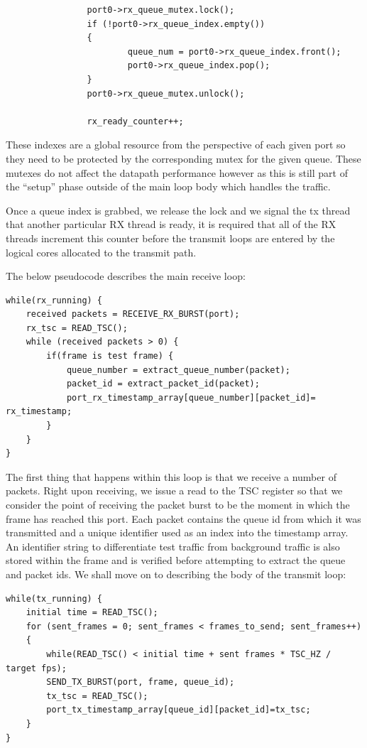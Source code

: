 \documentclass[a4paper,12p]{article}
\begin{document}
\begin{lstlisting}
                port0->rx_queue_mutex.lock();
                if (!port0->rx_queue_index.empty())
                {
                        queue_num = port0->rx_queue_index.front();
                        port0->rx_queue_index.pop();
                }
                port0->rx_queue_mutex.unlock();

                rx_ready_counter++;

\end{lstlisting}

These indexes are a global resource from the perspective of each given port so they need to be protected by the corresponding mutex for the given queue. These mutexes do not affect the datapath performance however as this is still part of the “setup” phase outside of the main loop body which handles the traffic.

Once a queue index is grabbed, we release the lock and we signal the tx thread that another particular RX thread is ready, it is required that all of the RX threads increment this counter before the transmit loops are entered by the logical cores allocated to the transmit path.

The below pseudocode describes the main receive loop:

\begin{lstlisting}
while(rx_running) {
	received packets = RECEIVE_RX_BURST(port);
	rx_tsc = READ_TSC();
	while (received packets > 0) {
		if(frame is test frame) {
			queue_number = extract_queue_number(packet);
			packet_id = extract_packet_id(packet);
			port_rx_timestamp_array[queue_number][packet_id]= rx_timestamp;
		}
	}
}
\end{lstlisting}

The first thing that happens within this loop is that we receive a number of packets. Right upon receiving, we issue a read to the TSC register so that we consider the point of receiving the packet burst to be the moment in which the frame has reached this port. Each packet contains the queue id from which it was transmitted and a unique identifier used as an index into the timestamp array. An identifier string to differentiate test traffic from background traffic is also stored within the frame and is verified before attempting to extract the queue and packet ids.
	We shall move on to describing the body of the transmit loop:

\begin{lstlisting}
while(tx_running) {
	initial time = READ_TSC();
	for (sent_frames = 0; sent_frames < frames_to_send; sent_frames++)
	{
		while(READ_TSC() < initial time + sent frames * TSC_HZ / target fps);
		SEND_TX_BURST(port, frame, queue_id);
		tx_tsc = READ_TSC();
		port_tx_timestamp_array[queue_id][packet_id]=tx_tsc;
	}
}

\end{lstlisting}
\end{document}
